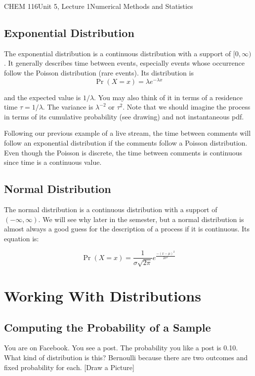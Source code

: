 \documentclass{article}
\begin{document}
\begin{tdoc}{CHEM 116}{Unit 5, Lecture 1}{Numerical Methods and Statistics}
\subsection{Exponential Distribution}
The exponential distribution is a continuous distribution with a
support of $[0,\infty)$. It generally describes time between events,
  especially events whose occurrence follow the Poisson distribution
  (rare events). Its distribution is
\begin{equation}
\Pr(X = x) = \lambda e^{-\lambda x}
\end{equation}

and the expected value is $ 1 / \lambda$. You may also think of it in
terms of a residence time $\tau = 1 / \lambda$. The variance is
$\lambda^{-2}$ or $\tau^2$. Note that we should imagine the process in
terms of its cumulative probability (see drawing) and not
instantaneous pdf.

Following our previous example of a live stream, the time between
comments will follow an exponential distribution if the comments
follow a Poisson distribution. Even though the Poisson is discrete,
the time between comments is continuous since time is a continuous
value.


\subsection{Normal Distribution}

The normal distribution is a continuous distribution with a support
of $(-\infty, \infty)$. We will see why later in the semester, but a
normal distribution is almost always a good guess for the
description of a process if it is continuous. Its equation is:

\begin{equation}    
  \Pr(X = x) = \frac{1}{\sigma\sqrt{2\pi}}e^{\frac{-(x - \mu)^2}{2\sigma ^2}}
\end{equation}
  

\section{Working With Distributions}

\subsection{Computing the Probability of a Sample}

You are on Facebook. You see a post. The probability you like a post
is 0.10. What kind of distribution is this? Bernoulli because there
are two outcomes and fixed probability for each. [Draw a Picture]


\end{tdoc}
\end{document}
